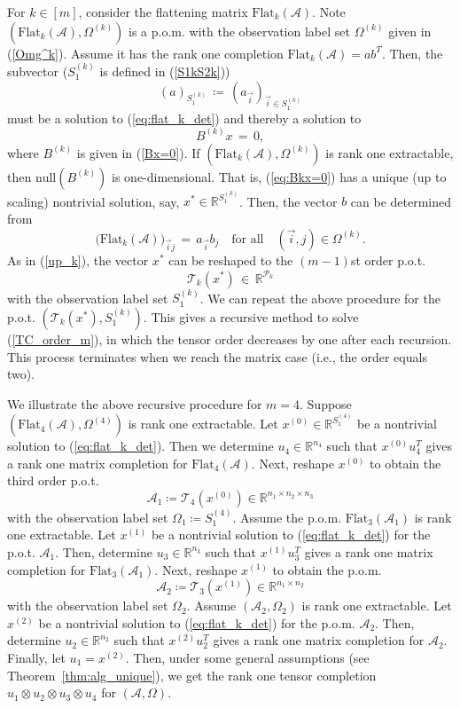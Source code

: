 \documentclass{amsart}
\newcommand{\re}{\mathbb{R}}
\newcommand{\reff}[1]{(\ref{#1})}
\newcommand{\mc}[1]{\mathcal{#1}}
\newcommand{\Flat}{\mbox{Flat}}
\newcommand{\be}{\begin{equation}}
\newcommand{\ee}{\end{equation}}
\theoremstyle{definition}
\numberwithin{equation}{section}
\begin{document}
For $k \in [m]$, 
consider the flattening matrix $\Flat_k(\mc A)$.
Note $(\Flat_k(\mc A), \Omega^{(k)})$ is a p.o.m. 
with the observation label set $\Omega^{(k)}$ given in \reff{Omg^k}.
Assume it has the rank one completion
$
\Flat_k(\mc A) = ab^T.
$
Then, the subvector ($S_1^{(k)}$ is defined in \reff{S1kS2k})
\[
(a)_{S_1^{(k)}} \,\coloneqq\, (a_{\vec{i}})_{\vec{i} \in S_1^{(k)}}
\] 
must be a solution to \reff{eq:flat_k_det} and thereby a solution to
\be\label{eq:Bkx=0}
B^{(k)}x \,=\, 0,
\ee
where $B^{(k)}$ is given in \reff{Bx=0}.
If $(\Flat_k(\mc A), \Omega^{(k)})$ is rank one extractable, 
then $\text{null}(B^{(k)})$ is one-dimensional.
That is, \reff{eq:Bkx=0} has a unique (up to scaling) nontrivial solution, say, $x^* \in \re^{S_1^{(k)}}$.
Then, the vector $b$ can be determined from
\[
\big( \Flat_k(\mc{A}) \big)_{\vec{i} j} \,=\, a_{\vec{i}} b_j \quad \text{for all} \quad (\vec{i}, j) \in \Omega^{(k)}.
\]
As in \reff{up_k}, the vector $x^*$ can be reshaped to the $(m-1)$st order p.o.t.
\[
\mc{T}_k(x^*) \,\in\, \re^{\mc{P}_k}
\]
with the observation label set $S_1^{(k)}$.
We can repeat the above procedure for the p.o.t. $(\mc{T}_k(x^*), S_1^{(k)})$.
This gives a recursive method to solve \reff{TC_order_m}, 
in which the tensor order decreases by one after each recursion.
This process terminates when we reach the matrix case (i.e., the order equals two).





We illustrate the above recursive procedure for $m=4$.
Suppose $(\Flat_4(\mc A), \Omega^{(4)})$ is rank one extractable.
Let $x^{(0)} \in \re^{S_1^{(4)}}$ be a nontrivial solution to \reff{eq:flat_k_det}.
Then we determine $u_4 \in \re^{n_4}$ such that 
$x^{(0)} u_4^T$ gives a rank one matrix completion for $\Flat_4(\mc A)$.
Next, reshape $x^{(0)}$ to obtain the third order p.o.t.
\[
\mc A_1 \coloneqq \mc{T}_4(x^{(0)}) \in \re^{n_1\times n_2\times n_3}
\]
with the observation label set $\Omega_1 \coloneqq S_1^{(4)}$.
Assume the p.o.m. $\Flat_3(\mc A_1)$ is rank one extractable.
Let $x^{(1)}$ be a nontrivial solution to \reff{eq:flat_k_det} for the p.o.t. $\mc{A}_1$.
Then, determine $u_3 \in \re^{n_3}$ such that $x^{(1)} u_3^T$ gives a rank one matrix completion for
$\Flat_3(\mc{A}_1)$.
Next, reshape $x^{(1)}$ to obtain the p.o.m.
\[
\mc{A}_2 \coloneqq \mc{T}_3(x^{(1)}) \in \re^{n_1\times n_2}
\]
with the observation label set $\Omega_2$.
Assume $(\mc{A}_2, \Omega_2)$ is rank one extractable. 
Let $x^{(2)}$ be a nontrivial solution to \reff{eq:flat_k_det} for the p.o.m. $\mc{A}_2$.
Then, determine $u_2 \in \re^{n_2}$ such that $x^{(2)}u_2^T$ gives a rank one matrix completion for $\mc{A}_2$.
Finally, let $u_1 = x^{(2)}$.
Then, under some general assumptions (see Theorem~\ref{thm:alg_unique}),
we get the rank one tensor completion 
$u_1 \otimes u_2 \otimes u_3 \otimes u_4$ for $(\mc{A}, \Omega)$.
\end{document}
